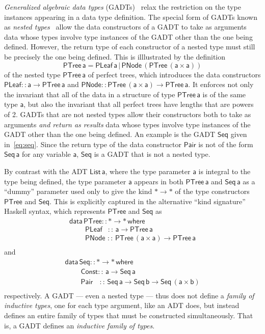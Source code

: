 \documentclass[submission,copyright,creativecommons]{eptcs}
\begin{document}
{\em Generalized algebraic data types} (GADTs)~\cite{pvww06} relax the
restriction on the type instances appearing in a data type
definition. The special form of GADTs known as {\em nested
  types}~\cite{bm98} allow the data constructors of a GADT to take as
arguments data whose types involve type instances of the GADT other
than the one being defined. However, the return type of each
constructor of a nested type must still be precisely the one being
defined. This is illlustrated by the definition
\[\mathsf{PTree \, a = PLeaf \,a \,|\, PNode \,(PTree\,(a \times
  a))}\] of the nested type $\mathsf{PTree\,a}$ of perfect trees,
which introduces the data constructors $\mathsf{PLeaf :: a \to
  PTree\,a}$ and $\mathsf{PNode :: PTree \,(a\times a) \to
  PTree\,a}$. It enforces not only the invariant that all of the data
in a structure of type $\mathsf{PTree\,a}$ is of the same type
$\mathsf{a}$, but also the invariant that all perfect trees have
lengths that are powers of 2. GADTs that are not nested types allow
their constructors both to take as arguments {\em and return as
  results} data whose types involve type instances of the GADT other
than the one being defined. An example is the GADT $\mathsf{Seq}$
given in~\eqref{eq:seq}. Since the return type of the data constructor
$\mathsf{Pair}$ is not of the form $\mathsf{Seq\,a}$ for any variable
$\mathsf{a}$, $\mathsf{Seq}$ is a GADT that is not a nested type.

By contrast with the ADT $\mathsf{List\, a}$, where the type parameter
$\mathsf{a}$ is integral to the type being defined, the type parameter
$\mathsf{a}$ appears in both $\mathsf{PTree\,a}$ and $\mathsf{Seq\,a}$
as a ``dummy'' parameter used only to give the kind $\mathsf{* \to *}$ of
the type constructors $\mathsf{PTree}$ and $\mathsf{Seq}$. This is
explicitly captured in the alternative ``kind signature'' Haskell
syntax, which represents $\mathsf{PTree}$ and $\mathsf{Seq}$ as
\[\begin{array}{l}
\mathsf{data\, PTree :: * \to *\,where}\\
\mathsf{\;\;\;\;\;\;\;\;PLeaf \,\,\,\;::\, a \to PTree\,a}\\
\mathsf{\;\;\;\;\;\;\;\;PNode\,\, ::\, PTree \,(a \times a) \to
  PTree\,a}\\ 
\end{array}\]
\noindent
and
\[\begin{array}{l}
\mathsf{data\, Seq :: * \to *\,where}\\
\mathsf{\;\;\;\;\;\;\;\;Const ::\, a \to Seq\,a}\\
\mathsf{\;\;\;\;\;\;\;\;Pair\,\,\,\,\; ::\, Seq \,a \to Seq\,b \to
  Seq\,(a \times b)}\\ 
\end{array}\]
respectively. A GADT --- even a nested type --- thus does not define a {\em family
  of inductive types}, one for each type argument, like an ADT does,
but instead defines an entire family of types that must be constructed
simultaneously. That is, a GADT defines an {\em inductive family of
  types}.
\end{document}

